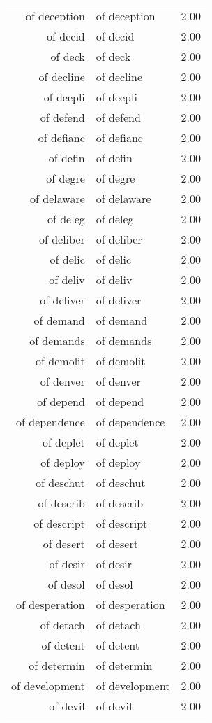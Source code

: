 \begin{table}[ht]
\begin{tabular}{rlr}
  of deception & of deception & 2.00 \\ 
  of decid & of decid & 2.00 \\ 
  of deck & of deck & 2.00 \\ 
  of decline & of decline & 2.00 \\ 
  of deepli & of deepli & 2.00 \\ 
  of defend & of defend & 2.00 \\ 
  of defianc & of defianc & 2.00 \\ 
  of defin & of defin & 2.00 \\ 
  of degre & of degre & 2.00 \\ 
  of delaware & of delaware & 2.00 \\ 
  of deleg & of deleg & 2.00 \\ 
  of deliber & of deliber & 2.00 \\ 
  of delic & of delic & 2.00 \\ 
  of deliv & of deliv & 2.00 \\ 
  of deliver & of deliver & 2.00 \\ 
  of demand & of demand & 2.00 \\ 
  of demands & of demands & 2.00 \\ 
  of demolit & of demolit & 2.00 \\ 
  of denver & of denver & 2.00 \\ 
  of depend & of depend & 2.00 \\ 
  of dependence & of dependence & 2.00 \\ 
  of deplet & of deplet & 2.00 \\ 
  of deploy & of deploy & 2.00 \\ 
  of deschut & of deschut & 2.00 \\ 
  of describ & of describ & 2.00 \\ 
  of descript & of descript & 2.00 \\ 
  of desert & of desert & 2.00 \\ 
  of desir & of desir & 2.00 \\ 
  of desol & of desol & 2.00 \\ 
  of desperation & of desperation & 2.00 \\ 
  of detach & of detach & 2.00 \\ 
  of detent & of detent & 2.00 \\ 
  of determin & of determin & 2.00 \\ 
  of development & of development & 2.00 \\ 
  of devil & of devil & 2.00 \\ 

\end{tabular}
\end{table}
